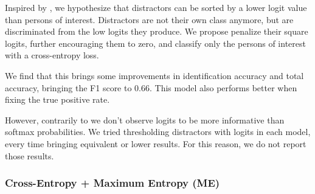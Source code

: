 Inspired by \citet{goodosr}, we hypothesize that distractors can be sorted by a lower logit value than persons of interest. Distractors are not their own class anymore, but are discriminated from the low logits they produce. We propose penalize their square logits, further encouraging them to zero, and classify only the persons of interest with a cross-entropy loss.

We find that this brings some improvements in identification accuracy and total accuracy, bringing the F1 score to 0.66. This model also performs better when fixing the true positive rate.

However, contrarily to \citet{goodosr} we don't observe logits to be more informative than softmax probabilities. We tried thresholding distractors with logits in each model, every time bringing equivalent or lower results. For this reason, we do not report those results.

\subsubsection{Cross-Entropy + Maximum Entropy (ME)}

